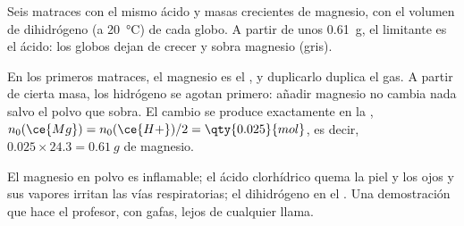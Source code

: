 \begin{omfigure}

{\small Seis matraces con el mismo ácido y masas crecientes de magnesio,
con el volumen de dihidrógeno (a \qty{20}{\celsius}) de cada globo. A
partir de unos \qty{0.61}{g}, el limitante es el ácido: los globos dejan
de crecer y sobra magnesio (gris).}
\end{omfigure}

\begin{remark}\label{rem:g10:reaction-progress-table:plateau}
En los primeros matraces, el magnesio es el , y
duplicarlo duplica el gas. A partir de cierta masa, los  hidrógeno
se agotan primero: añadir magnesio no cambia nada salvo el polvo que
sobra. El cambio se produce exactamente en la ,
$n_0(\ce{Mg}) = n_0(\ce{H+})/2 = \qty{0.025}{mol}$, es decir,
$0.025 \times 24.3 = \qty{0.61}{g}$ de magnesio.
\end{remark}

\begin{safety}{}
El magnesio en polvo es inflamable; el ácido clorhídrico quema la piel y
los ojos y sus vapores irritan las vías respiratorias; el dihidrógeno
 en el . Una demostración que hace el profesor, con gafas, lejos
de cualquier llama.
\end{safety}

